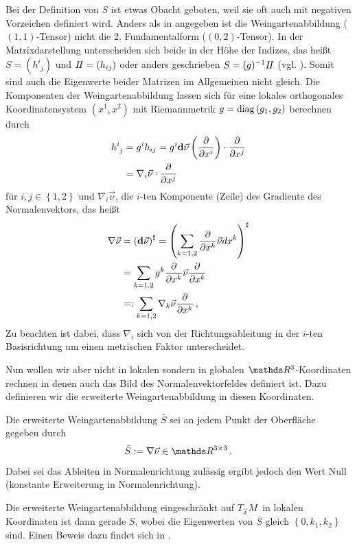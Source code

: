   Bei der Definition von \( S \) ist etwas Obacht geboten, weil sie oft auch mit negativen Vorzeichen definiert wird.
  Anders als in \cite{heine} angegeben ist die Weingartenabbildung (\( (1,1) \)-Tensor) nicht die 2. Fundamentalform
  (\( (0,2) \)-Tensor). In der Matrixdarstellung unterscheiden sich beide in der Höhe der Indizes, das heißt
  \( S = \left(h^{i}_{\phantom{i}j}\right)\) und \( I \! I = \left( h_{ij} \right) \) oder anders geschrieben   \( S = (g)^{-1} I \! I \)
  (vgl. \cite{FirstCourse}).
  Somit sind auch die Eigenwerte beider Matrizen im Allgemeinen nicht gleich.
  Die Komponenten der Weingartenabbildung lassen sich für eine lokales orthogonales Koordinatensystem \( \left( x^{1},x^{2} \right) \)
  mit Riemannmetrik \( g=\text{diag}\left( g_{1},g_{2} \right) \) berechnen durch
  \begin{align}
    h^{i}_{\phantom{i}j} &=  g^{i}h_{ij} = g^{i} \mathbf{d}\vec{\nu}\left(\frac{\partial}{\partial x^{i}}\right) 
                                                  \cdot \frac{\partial}{\partial x^{j}} \\
                          &= \nabla_{i} \vec{\nu} \cdot \frac{\partial}{\partial x^{j}}
  \end{align}
  für \( i,j\in\left\{ 1,2 \right\} \) und \( \nabla_{i} \vec{\nu} \), die \( i \)-ten Komponente (Zeile) des Gradiente des
  Normalenvektors,
  das heißt
  \begin{align}
    \nabla\vec{\nu} &= \left( \mathbf{d} \vec{\nu}\right)^{\sharp}
                     = \left( \sum_{k=1,2} \frac{\partial}{\partial x^{k}} \vec{\nu} dx^{k} \right)^{\sharp} \\
                    &= \sum_{k=1,2} g^{k}\frac{\partial}{\partial x^{k}} \vec{\nu}\frac{\partial}{\partial x^{k}}  \\
                    &=: \sum_{k=1,2} \nabla_{k}\vec{\nu}\frac{\partial}{\partial x^{k}} \,\text{,}
  \end{align}
  Zu beachten ist dabei, dass \( \nabla_{i} \) sich von der Richtungsableitung in der \( i \)-ten Basisrichtung um einen metrischen Faktor
  unterscheidet.

  Nun wollen wir aber nicht in lokalen sondern in globalen \( \R^{3} \)-Koordinaten rechnen in denen auch das Bild des Normalenvektorfeldes
  definiert ist. 
  Dazu definieren wir die erweiterte Weingartenabbildung in diesen Koordinaten.
  \begin{definition}
    Die erweiterte Weingartenabbildung \( \bar{S} \) sei an jedem Punkt der Oberfläche gegeben durch
    \begin{align}
      \bar{S}:= \nabla\vec{\nu} \in \R^{3 \times 3} \formpunkt
    \end{align}
    Dabei sei das Ableiten in Normalenrichtung zulässig ergibt jedoch den Wert Null (konstante Erweiterung in Normalenrichtung).
  \end{definition}
  Die erweiterte Weingartenabbildung eingeschränkt auf \( T_{\vec{x}}M \)\ in lokalen Koordinaten ist dann gerade \( S \),
  wobei die Eigenwerten von \( \bar{S} \) gleich \( \left\{ 0, k_{1},k_{2} \right\} \) sind.
  Einen Beweis dazu findet sich in \cite[Part 2, Kap.2]{kimura}.
  

